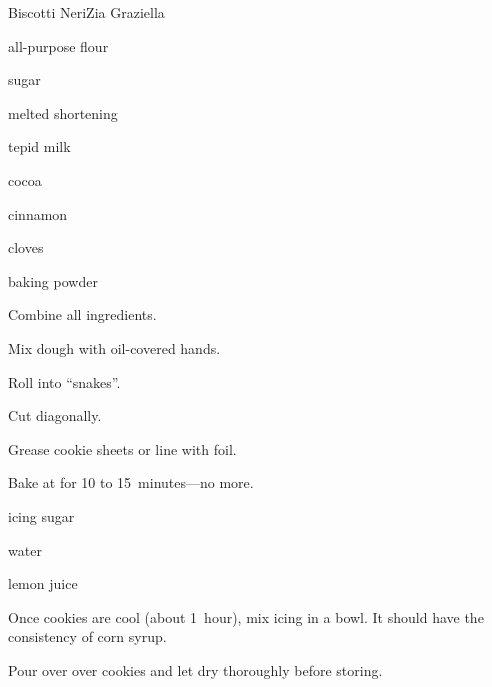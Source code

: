 \begin{recipe}{Biscotti Neri}{Zia Graziella}{}

\begin{ingredients}
\item {} all-purpose flour
\item {} sugar
\item \lbs{\half} melted shortening
\item {} tepid milk
\item {} cocoa
\item {} cinnamon
\item {} cloves
\item {} baking powder
\end{ingredients}

\begin{directions}
\item Combine all ingredients.
\item Mix dough with oil-covered hands.
\item Roll into ``snakes''.
\item Cut diagonally.
\item Grease cookie sheets or line with foil.
\item Bake at  for 10 to 15~minutes---no more.
\end{directions}


\begin{ingredients}
\item icing sugar
\item water
\item lemon juice
\end{ingredients}

\begin{directions}
\item Once cookies are cool (about 1~hour), mix icing in a bowl. It should have the consistency of corn syrup.
\item Pour over over cookies and let dry thoroughly before storing.
\end{directions}

\end{recipe}
